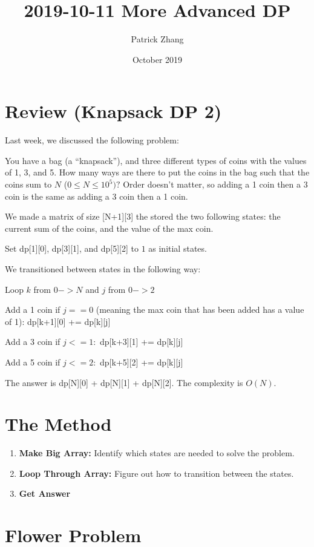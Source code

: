 \documentclass{article}
\title{2019-10-11 More Advanced DP}
\author{Patrick Zhang}
\date{October 2019}
\begin{document}
\maketitle

\section{Review (Knapsack DP 2)}
Last week, we discussed the following problem:

You have a bag (a ``knapsack''), and three different types of coins with the values of 1, 3, and 5. How many ways are there to put the coins in the bag such that the coins sum to $N$ ($0 \leq N \leq 10^5)?$ Order doesn't matter, so adding a 1 coin then a 3 coin is the same as adding a 3 coin then a 1 coin. 

We made a matrix of size [N+1][3] the stored the two following states: the current sum of the coins, and the value of the max coin. 

Set dp[1][0], dp[3][1], and dp[5][2] to $1$ as initial states.

We transitioned between states in the following way: 

Loop $k$ from $0 -> N$ and $j$ from $0 -> 2$

Add a 1 coin if $j == 0$ (meaning the max coin that has been added has a value of 1): dp[k+1][0] += dp[k][j]

Add a 3 coin if $j <= 1:$ dp[k+3][1] += dp[k][j]

Add a 5 coin if $j <= 2:$ dp[k+5][2] += dp[k][j]

The answer is dp[N][0] + dp[N][1] + dp[N][2]. The complexity is $O(N).$

\section{The Method}

\begin{enumerate}
    \item \textbf{Make Big Array:} Identify which states are needed to solve the problem. 
    \item \textbf{Loop Through Array:} Figure out how to transition between the states.
    \item \textbf{Get Answer}
\end{enumerate}

\section{Flower Problem}
\end{document}
